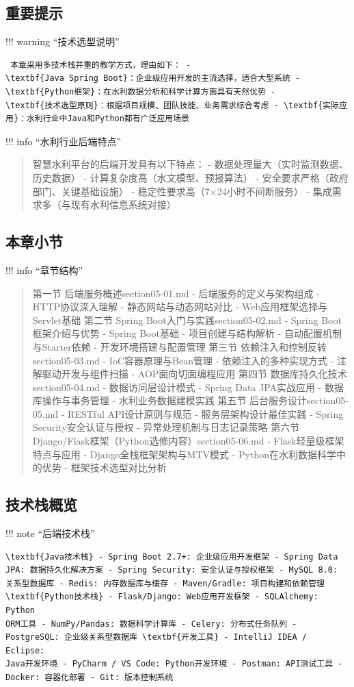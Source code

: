 \subsection{重要提示}\label{ux91cdux8981ux63d0ux793a} !!! warning ``技术选型说明'' \begin{verbatim} 本章采用多技术栈并重的教学方式，理由如下： -
\textbf{Java Spring Boot}：企业级应用开发的主流选择，适合大型系统 - \textbf{Python框架}：在水利数据分析和科学计算方面具有天然优势 -
\textbf{技术选型原则}：根据项目规模、团队技能、业务需求综合考虑 - \textbf{实际应用}：水利行业中Java和Python都有广泛应用场景 \end{verbatim} !!! info ``水利行业后端特点''
\begin{quote}
 智慧水利平台的后端开发具有以下特点： - 数据处理量大（实时监测数据、历史数据） - 计算复杂度高（水文模型、预报算法） - 安全要求严格（政府部门、关键基础设施） -
稳定性要求高（7×24小时不间断服务） - 集成需求多（与现有水利信息系统对接） 
\end{quote} \subsection{本章小节}\label{ux672cux7ae0ux5c0fux8282} !!! info
``章节结构'' \begin{quote}
 第一节 后端服务概述section05-01.md - 后端服务的定义与架构组成 - HTTP协议深入理解 - 静态网站与动态网站对比 - Web应用框架选择与Servlet基础
第二节 Spring Boot入门与实践section05-02.md - Spring Boot框架介绍与优势 - Spring Boot基础 - 项目创建与结构解析 - 自动配置机制与Starter依赖 -
开发环境搭建与配置管理 第三节 依赖注入和控制反转section05-03.md - IoC容器原理与Bean管理 - 依赖注入的多种实现方式 - 注解驱动开发与组件扫描 - AOP面向切面编程应用 第四节
数据库持久化技术section05-04.md - 数据访问层设计模式 - Spring Data JPA实战应用 - 数据库操作与事务管理 - 水利业务数据建模实践 第五节 后台服务设计section05-05.md -
RESTful API设计原则与规范 - 服务层架构设计最佳实践 - Spring Security安全认证与授权 - 异常处理机制与日志记录策略 第六节
Django/Flask框架（Python选修内容）section05-06.md - Flask轻量级框架特点与应用 - Django全栈框架架构与MTV模式 - Python在水利数据科学中的优势 - 框架技术选型对比分析

\end{quote} \keypoints{ }\subsection{技术栈概览}\label{ux6280ux672fux6808ux6982ux89c8} !!! note ``后端技术栈'' \begin{verbatim}
\textbf{Java技术栈} - Spring Boot 2.7+: 企业级应用开发框架 - Spring Data JPA: 数据持久化解决方案 - Spring Security: 安全认证与授权框架 - MySQL 8.0:
关系型数据库 - Redis: 内存数据库与缓存 - Maven/Gradle: 项目构建和依赖管理 \textbf{Python技术栈} - Flask/Django: Web应用开发框架 - SQLAlchemy: Python
ORM工具 - NumPy/Pandas: 数据科学计算库 - Celery: 分布式任务队列 - PostgreSQL: 企业级关系型数据库 \textbf{开发工具} - IntelliJ IDEA / Eclipse:
Java开发环境 - PyCharm / VS Code: Python开发环境 - Postman: API测试工具 - Docker: 容器化部署 - Git: 版本控制系统 \end{verbatim}
